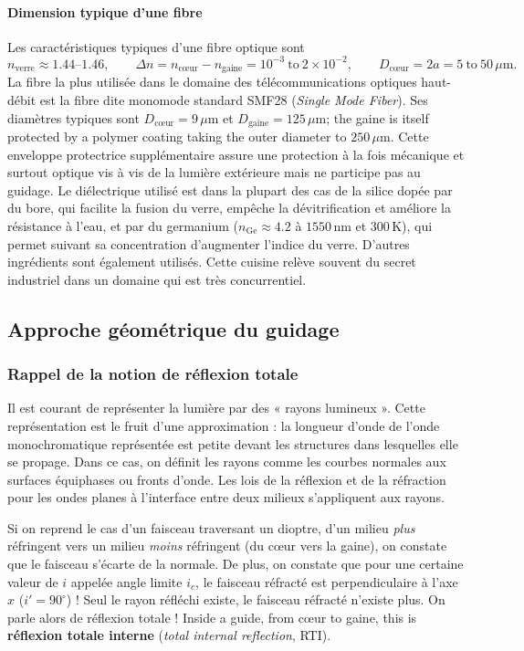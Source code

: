 \paragraph{Dimension typique d'une fibre} Les caractéristiques typiques d'une
fibre optique sont
\[
  n_{\text{verre}} \approx 1.44\text{--}1.46, \qquad
  \Delta n = n_{\text{cœur}} - n_{\text{gaine}} = 10^{-3}\ \text{to}\ 2\times 10^{-2},
  \qquad D_{\text{cœur}} = 2a = 5\ \text{to}\ 50\,\mu\mathrm{m}.
\]
La fibre la plus utilisée dans le domaine des télécommunications optiques
haut-débit est la fibre dite monomode standard SMF28 (\textit{Single Mode
Fiber}). Ses diamètres typiques sont $D_{\text{cœur}} =
9\,\mu$m et $D_{\text{gaine}} = 125\,\mu$m; the gaine is itself protected by a
polymer coating taking the outer diameter to
$250\,\mu$m. Cette enveloppe protectrice supplémentaire assure une protection à
la fois mécanique et surtout optique vis à vis de la lumière extérieure mais ne
participe pas au guidage. Le diélectrique utilisé est dans la plupart des cas
de la silice dopée par du bore, qui facilite la fusion du verre, empêche la
dévitrification et améliore la résistance à l'eau, et par du germanium
($n_{\text{Ge}} \approx 4.2$ à $1550$\,nm et $300$\,K), qui permet suivant sa
concentration d'augmenter l'indice du verre. D'autres ingrédients sont
également utilisés. Cette cuisine relève souvent du secret industriel dans un
domaine qui est très concurrentiel.

\subsection{Approche géométrique du guidage}

\subsubsection{Rappel de la notion de réflexion totale}
Il est courant de représenter la lumière par des « rayons lumineux ». Cette
représentation est le fruit d'une approximation : la longueur d'onde de l'onde
monochromatique représentée est petite devant les structures dans lesquelles
elle se propage. Dans ce cas, on définit les rayons comme les courbes normales
aux surfaces équiphases ou fronts d'onde. Les lois de la réflexion et de la
réfraction pour les ondes planes à l'interface entre deux milieux s'appliquent
aux rayons.

Si on reprend le cas d'un faisceau traversant un dioptre, d'un milieu
\emph{plus} réfringent vers un milieu \emph{moins} réfringent (du cœur vers la
gaine), on constate que le faisceau s'écarte de la normale. De plus, on
constate que pour une certaine valeur de $i$ appelée angle limite $i_c$, le
faisceau réfracté est perpendiculaire à l'axe $x$ ($i' = 90^\circ$) ! Seul le
rayon réfléchi existe, le faisceau réfracté n'existe plus. On parle alors de
réflexion totale ! Inside a guide, from cœur to gaine, this is
\textbf{réflexion totale interne} (\textit{total internal reflection}, RTI).

